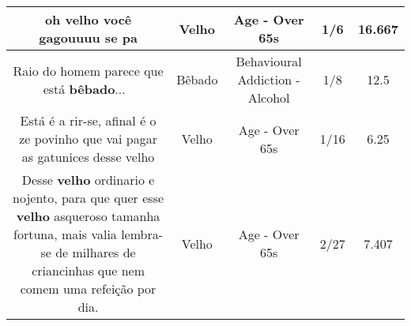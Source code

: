 \documentclass[11pt]{article}
\newlength\mylength
\begin{document}
\begin{center}
\begin{longtable}{|C{.65\mylength}|C{.30\mylength}|C{.12\mylength}|C{.12\mylength}|C{.12\mylength}|}
  \small oh \textbf{velho} você  gagouuuu se pa\normalsize   & Velho & Age - Over 65s & 1/6 & 16.667 \\  \hline
  \small Raio do homem parece que está \textbf{bêbado}... 🙈\normalsize   & Bêbado & Behavioural Addiction - Alcohol & 1/8 & 12.5 \\  \hline
  \small Está é a rir-se, afinal é o ze povinho que vai pagar as gatunices desse velho\normalsize   & Velho & Age - Over 65s & 1/16 & 6.25 \\  \hline
  \small Desse \textbf{velho} ordinario e nojento, para que quer esse \textbf{velho} asqueroso tamanha fortuna, mais valia lembra-se de milhares de criancinhas que nem comem uma refeição por dia.\normalsize   & Velho & Age - Over 65s & 2/27 & 7.407 \\  \hline
  
\end{longtable}
\end{center}
\end{document}
